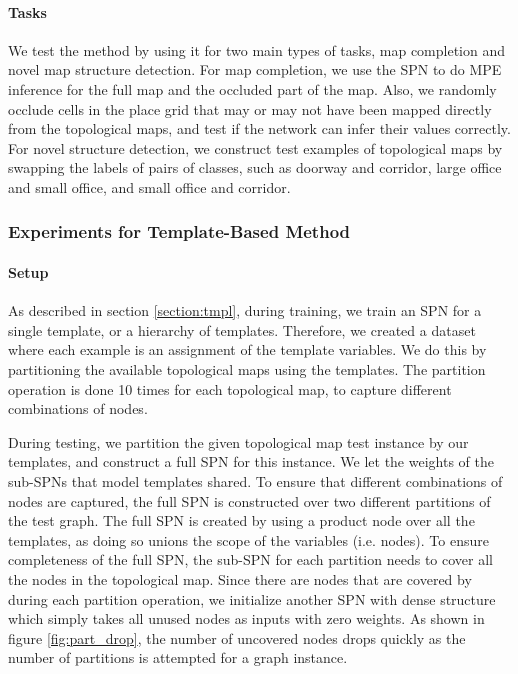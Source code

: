 \documentclass[11pt, titlepage]{article}
\theoremstyle{definition}
\begin{document}
\paragraph{Tasks} We test the method by using it for two main types of tasks, map completion and novel map structure detection. For map completion, we use the SPN to do MPE inference for the full map and the occluded part of the map. Also, we randomly occlude cells in the place grid that may or may not have been mapped directly from the topological maps, and test if the network can infer their values correctly. For novel structure detection, we construct test examples of topological maps by swapping the labels of pairs of classes, such as doorway and corridor, large office and small office, and small office and corridor.

\subsubsection{Experiments for Template-Based Method}\label{section:exp-tmpl}

\paragraph{Setup} As described in section \ref{section:tmpl}, during training, we train an SPN for a single template, or a hierarchy of templates. Therefore, we created a dataset where each example is an assignment of the template variables. We do this by partitioning the available topological maps using the templates. The partition operation is done 10 times for each topological map, to capture different combinations of nodes.

During testing, we partition the given topological map test instance by our templates, and construct a full SPN for this instance. We let the weights of the sub-SPNs that model templates shared.  To ensure that different combinations of nodes are captured, the full SPN is constructed over two different partitions of the test graph. The full SPN is created by using a product node over all the templates, as doing so unions the scope of the variables (i.e. nodes). To ensure completeness of the full SPN, the sub-SPN for each partition needs to cover all the nodes in the topological map. Since there are nodes that are covered by during each partition operation, we initialize another SPN with dense structure which simply takes all unused nodes as inputs with zero weights. As shown in figure \ref{fig:part_drop}, the number of uncovered nodes drops quickly as the number of partitions is attempted for a graph instance.
\end{document}
